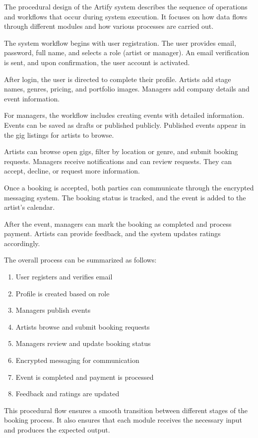 \documentclass[12pt,a4paper]{report}
\begin{document}
The procedural design of the Artify system describes the sequence of operations and workflows that occur during system execution. It focuses on how data flows through different modules and how various processes are carried out.

The system workflow begins with user registration. The user provides email, password, full name, and selects a role (artist or manager). An email verification is sent, and upon confirmation, the user account is activated.

After login, the user is directed to complete their profile. Artists add stage names, genres, pricing, and portfolio images. Managers add company details and event information.

For managers, the workflow includes creating events with detailed information. Events can be saved as drafts or published publicly. Published events appear in the gig listings for artists to browse.

Artists can browse open gigs, filter by location or genre, and submit booking requests. Managers receive notifications and can review requests. They can accept, decline, or request more information.

Once a booking is accepted, both parties can communicate through the encrypted messaging system. The booking status is tracked, and the event is added to the artist's calendar.

After the event, managers can mark the booking as completed and process payment. Artists can provide feedback, and the system updates ratings accordingly.

The overall process can be summarized as follows:

\begin{enumerate}
    \item User registers and verifies email
    \item Profile is created based on role
    \item Managers publish events
    \item Artists browse and submit booking requests
    \item Managers review and update booking status
    \item Encrypted messaging for communication
    \item Event is completed and payment is processed
    \item Feedback and ratings are updated
\end{enumerate}

This procedural flow ensures a smooth transition between different stages of the booking process. It also ensures that each module receives the necessary input and produces the expected output.
\end{document}
